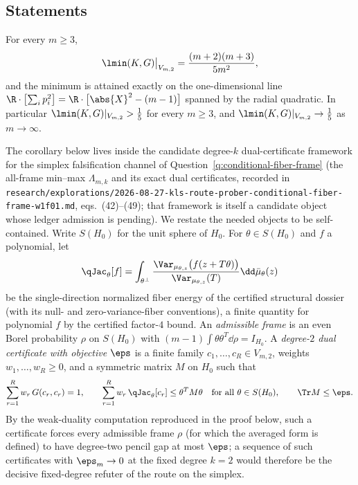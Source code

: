 \documentclass[../main.tex]{subfiles}
\begin{document}
\subsection*{Statements}

\begin{theorem}
\label{thm:sol-fiber-root-degree-two}
For every $m\ge3$,
\begin{equation}
  \lmin(K,G)\big|_{V_{m,2}}
  =\frac{(m+2)(m+3)}{5m^2},
  \label{eq:sol-frd2-main}
\end{equation}
and the minimum is attained exactly on the one-dimensional line
$\R\cdot\bigl[\textstyle\sum_i p_i^2\bigr]
 =\R\cdot\bigl[\abs{X}^2-(m-1)\bigr]$
spanned by the radial quadratic.  In particular
$\lmin(K,G)|_{V_{m,2}}>\tfrac15$ for every $m\ge3$, and
$\lmin(K,G)|_{V_{m,2}}\to\tfrac15$ as $m\to\infty$.
\end{theorem}

The corollary below lives inside the candidate degree-$k$ dual-certificate framework
for the simplex falsification channel of Question~\ref{q:conditional-fiber-frame}
(the all-frame min--max $\Lambda_{m,k}$ and its exact dual certificates, recorded in
\texttt{research/explorations/2026-08-27-kls-route-prober-conditional-fiber-frame-w1f01.md},
eqs.~(42)--(49); that framework is itself a candidate object whose ledger admission is
pending).  We restate the needed objects to be self-contained.  Write $S(H_0)$ for the
unit sphere of $H_0$.  For $\theta\in S(H_0)$ and $f$ a polynomial, let
\begin{equation}
  \qJac_\theta[f]
  =\int_{\theta^\perp}
   \frac{\Var_{\mu_{\theta,z}}\bigl(f(z+T\theta)\bigr)}
        {\Var_{\mu_{\theta,z}}(T)}
   \dd\bar\mu_\theta(z)
  \label{eq:sol-frd2-qtheta}
\end{equation}
be the single-direction normalized fiber energy of the certified structural dossier
(with its null- and zero-variance-fiber conventions), a finite quantity for polynomial
$f$ by the certified factor-$4$ bound.  An \emph{admissible frame} is an even Borel
probability $\rho$ on $S(H_0)$ with $(m-1)\int\theta\theta^T\dd\rho=I_{H_0}$.  A
\emph{degree-$2$ dual certificate with objective $\eps$} is a finite family
$c_1,\dots,c_R\in V_{m,2}$, weights $w_1,\dots,w_R\ge0$, and a symmetric matrix
$M$ on $H_0$ such that
\begin{equation}
  \sum_{r=1}^R w_r\,G(c_r,c_r)=1,
  \qquad
  \sum_{r=1}^R w_r\,\qJac_\theta[c_r]\le\theta^TM\theta
  \quad\text{for all }\theta\in S(H_0),
  \qquad
  \Tr M\le\eps.
  \label{eq:sol-frd2-certificate}
\end{equation}
By the weak-duality computation reproduced in the proof below, such a certificate
forces every admissible frame $\rho$ (for which the averaged form is defined) to have
degree-two pencil gap at most $\eps$; a sequence of such certificates with
$\eps_m\to0$ at the fixed degree $k=2$ would therefore be the decisive fixed-degree
refuter of the route on the simplex.
\end{document}

